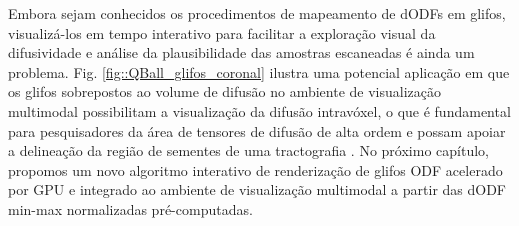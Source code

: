 \documentclass[
    12pt,                %
    oneside,            %
    a4paper,            %
    english,            %
    french,                %
    spanish,            %
    brazil                %
    ]{abntex2}
\begin{document}
Embora sejam conhecidos os procedimentos de mapeamento de dODFs em glifos, visualizá-los em tempo interativo para facilitar a exploração visual da difusividade e análise da plausibilidade das amostras escaneadas é ainda um problema. Fig. \ref{fig::QBall_glifos_coronal} ilustra uma potencial aplicação em que os glifos sobrepostos ao volume de difusão no ambiente de visualização multimodal possibilitam a visualização da difusão intravóxel, o que é fundamental para pesquisadores da área de tensores de difusão de alta ordem \cite{peeters2009} e possam apoiar a delineação da região de sementes de uma tractografia \cite{voltoline2021}.
No próximo capítulo, propomos um novo algoritmo interativo de renderização de glifos ODF acelerado por GPU e integrado ao ambiente de visualização multimodal a partir das dODF min-max normalizadas pré-computadas.

 
\end{document}
